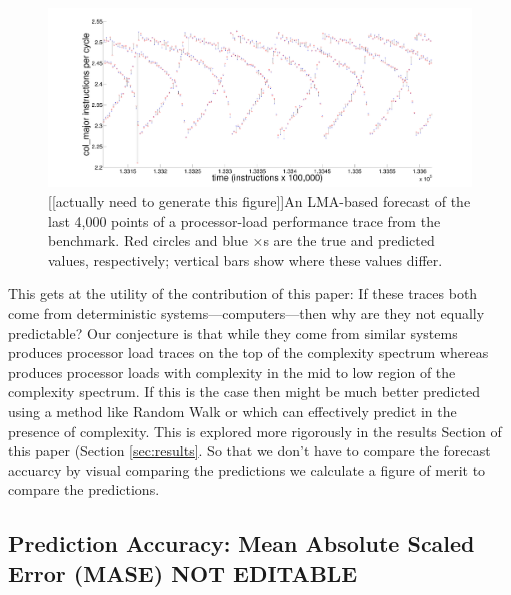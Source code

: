 \begin{figure}[htbp]
  \centering
    \includegraphics[width=\textwidth]{figs/colPredShortTS}
     \caption{{\color{red} [[actually need to generate this figure]]}An LMA-based forecast of the last 4,000 points of a
       processor-load performance trace from the \gcc
       benchmark.  Red circles and blue $\times$s are the true and
       predicted values, respectively; vertical bars show where these
       values differ.}
\label{fig:lmagcc}
\end{figure}

This gets at the utility of the contribution of this paper: If these traces both come from deterministic
systems---computers---then why are they not equally predictable?  Our
conjecture is that while they come from similar systems \gcc produces processor load traces on the top of the complexity spectrum whereas \col produces processor loads with complexity in the mid to low region of the complexity spectrum. If this is the case then \gcc might be much better predicted using a method like Random Walk or \naive which can effectively predict in the presence of complexity. This is explored more rigorously in the results Section of this paper (Section \ref{sec:results}. So that we don't have to compare the forecast accuarcy by visual comparing the predictions we calculate a figure of merit to compare the predictions. 







\subsection{Prediction Accuracy: Mean Absolute Scaled Error (MASE) {\color{red} NOT EDITABLE}}
\label{sec:accuracy}

